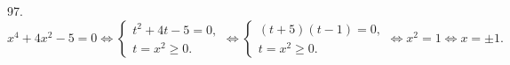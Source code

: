 97. $x^4+4x^2-5=0\Leftrightarrow \begin{cases}t^2+4t-5=0,\\ t=x^2\geqslant0.\end{cases}\Leftrightarrow
\begin{cases}(t+5)(t-1)=0,\\ t=x^2\geqslant0.\end{cases}\Leftrightarrow x^2=1 \Leftrightarrow x=\pm1.$\\

